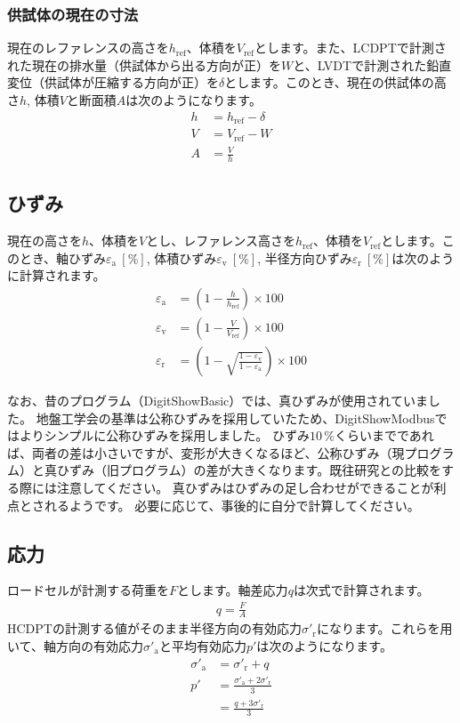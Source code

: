 \subsubsection{供試体の現在の寸法}
現在のレファレンスの高さを$h_\mathrm{ref}$、体積を$V_\mathrm{ref}$とします。また、LCDPTで計測された現在の排水量（供試体から出る方向が正）を$W$と、LVDTで計測された鉛直変位（供試体が圧縮する方向が正）を$\delta$とします。このとき、現在の供試体の高さ$h$, 体積$V$と断面積$A$は次のようになります。
\begin{align}
    h &= h_\mathrm{ref} - \delta \\
    V &= V_\mathrm{ref} - W \\
    A &= \frac{V}{h}
\end{align}

\subsection{ひずみ}
現在の高さを$h$、体積を$V$とし、レファレンス高さを$h_\mathrm{ref}$、体積を$V_\mathrm{ref}$とします。このとき、軸ひずみ$\varepsilon_\mathrm{a}\ \left[\%\right]$, 体積ひずみ$\varepsilon_\mathrm{v}\ \left[\%\right]$, 半径方向ひずみ$\varepsilon_\mathrm{r}\ \left[\%\right]$は次のように計算されます。
\begin{align}
    \varepsilon_\mathrm{a} &= \left(1 - \frac{h}{h_\mathrm{ref}}\right) \times 100 \\
    \varepsilon_\mathrm{v} &= \left(1 - \frac{V}{V_\mathrm{ref}}\right) \times 100 \\
    \varepsilon_\mathrm{r} &= \left(1 - \sqrt{\frac{1-\varepsilon_\mathrm{v}}{1-\varepsilon_\mathrm{a}}}\right) \times 100
\end{align}

なお、昔のプログラム（DigitShowBasic）では、真ひずみが使用されていました。
地盤工学会の基準は公称ひずみを採用していたため、DigitShowModbusではよりシンプルに公称ひずみを採用しました。
ひずみ$10\,\%$くらいまでであれば、両者の差は小さいですが、変形が大きくなるほど、公称ひずみ（現プログラム）と真ひずみ（旧プログラム）の差が大きくなります。既往研究との比較をする際には注意してください。
真ひずみはひずみの足し合わせができることが利点とされるようです。
必要に応じて、事後的に自分で計算してください。

\subsection{応力}
ロードセルが計測する荷重を$F$とします。軸差応力$q$は次式で計算されます。
\begin{align}
    q = \frac{F}{A}
\end{align}
HCDPTの計測する値がそのまま半径方向の有効応力${\sigma'}_\mathrm{r}$になります。これらを用いて、軸方向の有効応力${\sigma'}_\mathrm{a}$と平均有効応力$p'$は次のようになります。
\begin{align}
    {\sigma'}_\mathrm{a} &= {\sigma'}_\mathrm{r} + q \\
    p' &= \frac{{\sigma'}_\mathrm{a} + 2{\sigma'}_\mathrm{r}}{3} \\
    &= \frac{q + 3{\sigma'}_\mathrm{r}}{3}
\end{align}

